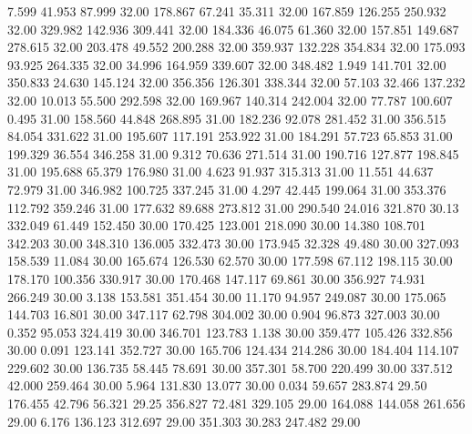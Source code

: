    7.599   41.953   87.999        32.00
 178.867   67.241   35.311        32.00
 167.859  126.255  250.932        32.00
 329.982  142.936  309.441        32.00
 184.336   46.075   61.360        32.00
 157.851  149.687  278.615        32.00
 203.478   49.552  200.288        32.00
 359.937  132.228  354.834        32.00
 175.093   93.925  264.335        32.00
  34.996  164.959  339.607        32.00
 348.482    1.949  141.701        32.00
 350.833   24.630  145.124        32.00
 356.356  126.301  338.344        32.00
  57.103   32.466  137.232        32.00
  10.013   55.500  292.598        32.00
 169.967  140.314  242.004        32.00
  77.787  100.607    0.495        31.00
 158.560   44.848  268.895        31.00
 182.236   92.078  281.452        31.00
 356.515   84.054  331.622        31.00
 195.607  117.191  253.922        31.00
 184.291   57.723   65.853        31.00
 199.329   36.554  346.258        31.00
   9.312   70.636  271.514        31.00
 190.716  127.877  198.845        31.00
 195.688   65.379  176.980        31.00
   4.623   91.937  315.313        31.00
  11.551   44.637   72.979        31.00
 346.982  100.725  337.245        31.00
   4.297   42.445  199.064        31.00
 353.376  112.792  359.246        31.00
 177.632   89.688  273.812        31.00
 290.540   24.016  321.870        30.13
 332.049   61.449  152.450        30.00
 170.425  123.001  218.090        30.00
  14.380  108.701  342.203        30.00
 348.310  136.005  332.473        30.00
 173.945   32.328   49.480        30.00
 327.093  158.539   11.084        30.00
 165.674  126.530   62.570        30.00
 177.598   67.112  198.115        30.00
 178.170  100.356  330.917        30.00
 170.468  147.117   69.861        30.00
 356.927   74.931  266.249        30.00
   3.138  153.581  351.454        30.00
  11.170   94.957  249.087        30.00
 175.065  144.703   16.801        30.00
 347.117   62.798  304.002        30.00
   0.904   96.873  327.003        30.00
   0.352   95.053  324.419        30.00
 346.701  123.783    1.138        30.00
 359.477  105.426  332.856        30.00
   0.091  123.141  352.727        30.00
 165.706  124.434  214.286        30.00
 184.404  114.107  229.602        30.00
 136.735   58.445   78.691        30.00
 357.301   58.700  220.499        30.00
 337.512   42.000  259.464        30.00
   5.964  131.830   13.077        30.00
   0.034   59.657  283.874        29.50
 176.455   42.796   56.321        29.25
 356.827   72.481  329.105        29.00
 164.088  144.058  261.656        29.00
   6.176  136.123  312.697        29.00
 351.303   30.283  247.482        29.00
